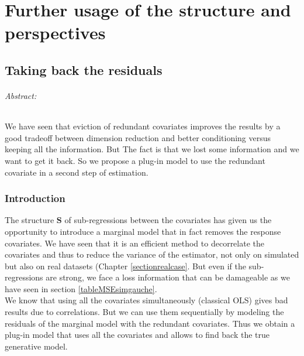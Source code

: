 \documentclass[12pt,a4paper]{report}
\begin{document}
\part{Further usage of the structure and perspectives}	
			
		
\chapter{Taking back the residuals}
	\paragraph{Abstract:} We have seen that eviction of redundant covariates improves the results by a good tradeoff between dimension reduction and better conditioning versus keeping all the information. But The fact is that we lost some information and we want to get it back. So we propose a plug-in model to use the redundant covariate in a second step of estimation.
	\section{Introduction}
		The structure $\boldsymbol{S}$ of sub-regressions between the covariates has given us the opportunity to introduce a marginal model that in fact removes the response covariates. We have seen that it is an efficient method to decorrelate the covariates and thus to reduce the variance of the estimator, not only on simulated but also on real datasets (Chapter \ref{sectionrealcase}. But even if the sub-regressions are strong, we face a loss information that can be damageable as we have seen in section \ref{tableMSEsimgauche}. \\
		
		We know that using all the covariates simultaneously (classical OLS) gives bad results due to correlations. But we can use them sequentially by modeling the residuals of the marginal model with the redundant covariates. Thus we obtain a plug-in model that uses all the covariates and allows to find back the true generative model.
\end{document}

